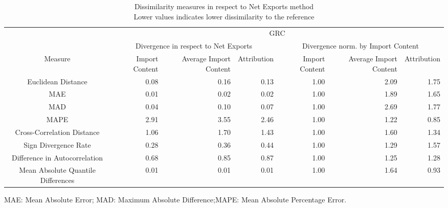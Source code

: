 \begin{table}[t]
\caption*{
{\large Dissimilarity measures in respect to Net Exports method} \\ 
{\small Lower values indicates lower dissimilarity to the reference}
} 
\fontsize{15.0pt}{18.0pt}\selectfont
\begin{tabular*}{\linewidth}{@{\extracolsep{\fill}}crrrrrr}
\toprule
 & \multicolumn{6}{c}{GRC} \\ 
\cmidrule(lr){2-7}
 & \multicolumn{3}{c}{Divergence in respect to Net Exports} & \multicolumn{3}{c}{Divergence norm. by Import Content} \\ 
\cmidrule(lr){2-4} \cmidrule(lr){5-7}
Measure & Import Content & Average Import Content & Attribution & Import Content & Average Import Content & Attribution \\ 
\midrule\addlinespace[2.5pt]
Euclidean Distance & 0.08 & 0.16 & 0.13 & 1.00 & 2.09 & 1.75 \\ 
MAE & 0.01 & 0.02 & 0.02 & 1.00 & 1.89 & 1.65 \\ 
MAD & 0.04 & 0.10 & 0.07 & 1.00 & 2.69 & 1.77 \\ 
MAPE & 2.91 & 3.55 & 2.46 & 1.00 & 1.22 & 0.85 \\ 
Cross-Correlation Distance & 1.06 & 1.70 & 1.43 & 1.00 & 1.60 & 1.34 \\ 
Sign Divergence Rate & 0.28 & 0.36 & 0.44 & 1.00 & 1.29 & 1.57 \\ 
Difference in Autocorrelation & 0.68 & 0.85 & 0.87 & 1.00 & 1.25 & 1.28 \\ 
Mean Absolute Quantile Differences & 0.01 & 0.01 & 0.01 & 1.00 & 1.64 & 0.93 \\ 
\bottomrule
\end{tabular*}
\begin{minipage}{\linewidth}
MAE: Mean Absolute Error; MAD: Maximum Absolute Difference;MAPE: Mean Absolute Percentage Error.\\
\end{minipage}
\end{table}

